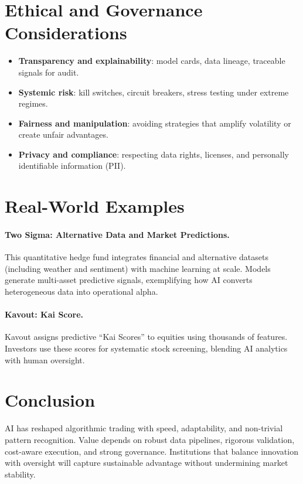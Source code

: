 \documentclass[12pt]{article}
\begin{document}
\section*{Ethical and Governance Considerations}
\begin{itemize}[leftmargin=*,itemsep=2pt]
  \item \textbf{Transparency and explainability}: model cards, data lineage, traceable signals for audit.
  \item \textbf{Systemic risk}: kill switches, circuit breakers, stress testing under extreme regimes.
  \item \textbf{Fairness and manipulation}: avoiding strategies that amplify volatility or create unfair advantages.
  \item \textbf{Privacy and compliance}: respecting data rights, licenses, and personally identifiable information (PII).
\end{itemize}

\section*{Real-World Examples}
\paragraph{Two Sigma: Alternative Data and Market Predictions.}
This quantitative hedge fund integrates financial and alternative datasets (including weather and sentiment) with machine learning at scale. Models generate multi-asset predictive signals, exemplifying how AI converts heterogeneous data into operational alpha.
\paragraph{Kavout: Kai Score.}
Kavout assigns predictive ``Kai Scores'' to equities using thousands of features. Investors use these scores for systematic stock screening, blending AI analytics with human oversight.

\section*{Conclusion}
AI has reshaped algorithmic trading with speed, adaptability, and non-trivial pattern recognition. Value depends on robust data pipelines, rigorous validation, cost-aware execution, and strong governance. Institutions that balance innovation with oversight will capture sustainable advantage without undermining market stability.
\end{document}
